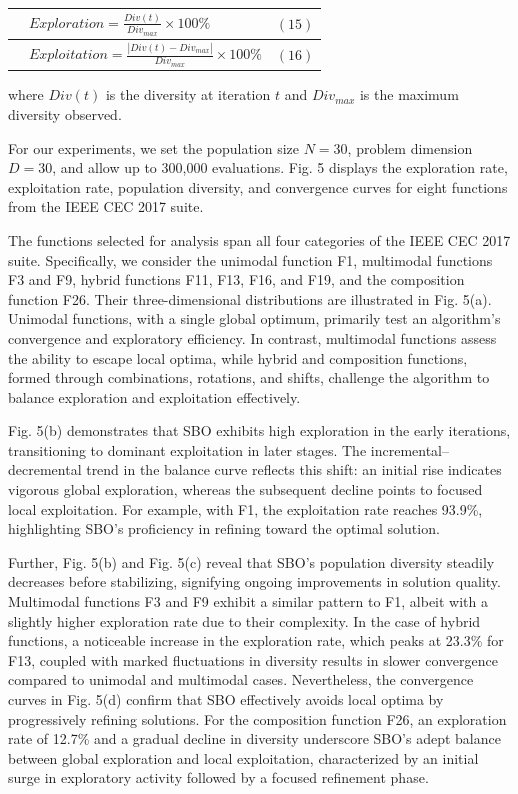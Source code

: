 \documentclass{article} %
\begin{document}
\begin{tabular}{|p{0.4in}|p{3.1in}|p{0.4in}|} \hline 
 & $Exploration=\frac{Div\left(t\right)}{Div_{max}}\times 100\%$ & $\left(\mathrm{15}\right)$ \\ \hline 
 & $Exploitation=\frac{\left|Div\left(t\right)-Div_{max}\right|}{Div_{max}}\times 100\%$ & $\left(\mathrm{16}\right)$ \\ \hline 
\end{tabular}

where $Div(t)$ is the diversity at iteration $t$ and $Div_{max}$ is the maximum diversity observed.

For our experiments, we set the population size $N=30$, problem dimension $D=30$, and allow up to 300,000 evaluations. Fig. 5 displays the exploration rate, exploitation rate, population diversity, and convergence curves for eight functions from the IEEE CEC 2017 suite.

The functions selected for analysis span all four categories of the IEEE CEC 2017 suite. Specifically, we consider the unimodal function F1, multimodal functions F3 and F9, hybrid functions F11, F13, F16, and F19, and the composition function F26. Their three-dimensional distributions are illustrated in Fig. 5(a). Unimodal functions, with a single global optimum, primarily test an algorithm's convergence and exploratory efficiency. In contrast, multimodal functions assess the ability to escape local optima, while hybrid and composition functions, formed through combinations, rotations, and shifts, challenge the algorithm to balance exploration and exploitation effectively.

Fig. 5(b) demonstrates that SBO exhibits high exploration in the early iterations, transitioning to dominant exploitation in later stages. The incremental--decremental trend in the balance curve reflects this shift: an initial rise indicates vigorous global exploration, whereas the subsequent decline points to focused local exploitation. For example, with F1, the exploitation rate reaches 93.9\%, highlighting SBO's proficiency in refining toward the optimal solution.

Further, Fig. 5(b) and Fig. 5(c) reveal that SBO's population diversity steadily decreases before stabilizing, signifying ongoing improvements in solution quality. Multimodal functions F3 and F9 exhibit a similar pattern to F1, albeit with a slightly higher exploration rate due to their complexity. In the case of hybrid functions, a noticeable increase in the exploration rate, which peaks at 23.3\% for F13, coupled with marked fluctuations in diversity results in slower convergence compared to unimodal and multimodal cases. Nevertheless, the convergence curves in Fig. 5(d) confirm that SBO effectively avoids local optima by progressively refining solutions. For the composition function F26, an exploration rate of 12.7\% and a gradual decline in diversity underscore SBO's adept balance between global exploration and local exploitation, characterized by an initial surge in exploratory activity followed by a focused refinement phase.
\end{document}
